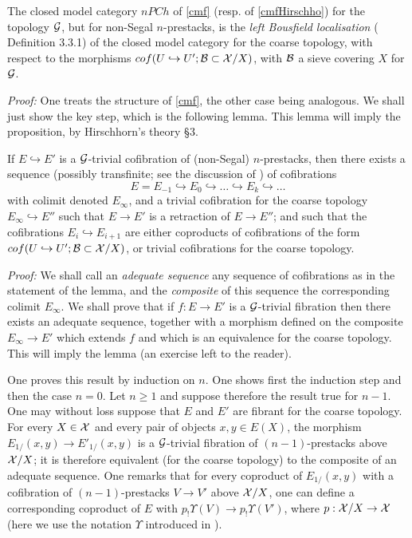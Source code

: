 \begin{proposition}
\label{naqualocaliser}
The
closed model category $nPCh$ of \ref{cmf} (resp. of \ref{cmfHirschho}) for
the topology ${\cal G}$, but for non-Segal $n$-prestacks,
is the \emph{left Bousfield localisation}
(\cite{Hirschhorn} Definition 3.3.1) of the closed model category
for
the coarse topology, with respect to the morphisms
$cof(U\hookrightarrow U'; {\cal B} \subset {\cal X} /X)$, with ${\cal B}$ a
sieve covering $X$ for ${\cal G}$.
\end{proposition}
{\em Proof:} One treats the structure of \ref{cmf}, the other case being
analogous.
We shall just show the key step, which is the following lemma.
This lemma
will imply the proposition, by Hirschhorn's theory \cite{Hirschhorn} \S 3.
\eop
\begin{lemma}
\label{pourloc}
If $E\hookrightarrow E'$ is a ${\cal G}$-trivial cofibration of
(non-Segal) $n$-prestacks,
then there
exists a
sequence (possibly transfinite; see the discussion of
\cite{Hirschhorn}
\cite{DHK}
\cite{HoveyBook}) of cofibrations
$$
E=E_{-1} \hookrightarrow E_0
\hookrightarrow \ldots \hookrightarrow E_k \hookrightarrow \ldots
$$
with colimit denoted $E_{\infty}$, and a trivial cofibration for
the coarse topology $E_{\infty} \hookrightarrow E''$ such that
$E\rightarrow E'$ is a retraction of $E\rightarrow E''$; and such that the
cofibrations $E_i \hookrightarrow E_{i+1}$ are either coproducts of
cofibrations of the form $cof(U\hookrightarrow U'; {\cal B} \subset {\cal X} /X)$,
or
trivial cofibrations for the coarse topology.
\end{lemma}
{\em Proof:}
We shall call an \emph{adequate sequence} any sequence of cofibrations as in
the statement of the lemma, and the \emph{composite} of this sequence the
corresponding colimit
$E_{\infty}$. We shall prove that if $f:E\rightarrow E'$ is a ${\cal G}$-trivial
fibration then there exists an adequate sequence, together with a morphism
defined on the composite
$E_{\infty}\rightarrow E'$ which extends $f$ and which is an equivalence
for the coarse topology. This will imply the lemma (an exercise left to the
reader).

One proves this result by induction on $n$. One shows
first the induction step
and then the case $n=0$. Let $n\geq 1$ and suppose therefore the result true
for $n-1$. One may without loss suppose that $E$ and $E'$ are fibrant for the
coarse topology. For every $X\in {\cal X}$ and every
pair of objects $x,y\in E(X)$,
the morphism $E_{1/} (x,y)\rightarrow E'_{1/}(x,y)$ is a ${\cal G}$-trivial
fibration of $(n-1)$-prestacks above ${\cal X} /X$; it is therefore
equivalent (for the coarse topology) to the composite of an adequate
sequence. One remarks that for every coproduct of $E_{1/}(x,y)$ with a
cofibration of $(n-1)$-prestacks $V\rightarrow V'$ above ${\cal X}
/X$, one can define a corresponding coproduct of $E$ with $p_!\Upsilon
(V)\rightarrow p_!\Upsilon (V')$, where $p: {\cal X} /X \rightarrow {\cal X}$
(here we use the notation $\Upsilon$ introduced in \cite{limits}).

